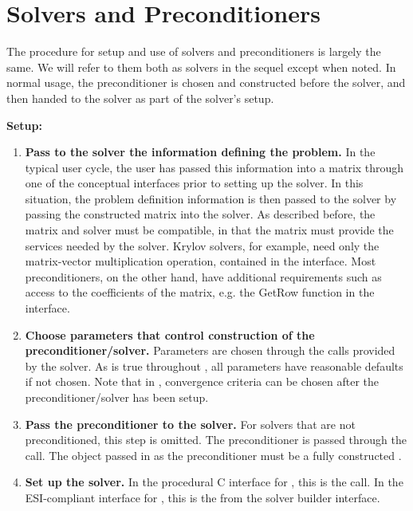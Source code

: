 \chapter{Solvers and Preconditioners}
\label{solvers}

The procedure for setup and use of solvers and preconditioners is largely
the same. We will refer to them both as solvers in the sequel except when noted. 
In normal usage, 
the preconditioner is chosen and constructed before the solver,
and then handed to the solver as part of the solver's setup.

{\bf Setup:}

\begin{enumerate}

\item
{\bf Pass to the solver the information defining the problem.} In the typical user cycle, the user
has passed this information into a matrix through one of the conceptual interfaces prior to
setting up the solver. In this situation, the problem definition information is then passed to
the solver by passing the constructed matrix into the solver. As described before, the matrix
and solver must be compatible, in that the matrix must provide the services needed by
the solver. Krylov solvers, for example, need only the matrix-vector multiplication operation,
contained in the  interface. 
Most preconditioners, on the other hand, have additional requirements such as access to the
coefficients of the matrix, e.g. the GetRow function in the  interface.

\item
{\bf Choose parameters that control construction of the preconditioner/solver.} 
Parameters are chosen through the  calls provided by the solver.
As is true throughout \hypre{}, all parameters have reasonable defaults if not chosen.
Note that in \hypre{}, convergence criteria can be chosen after the preconditioner/solver
has been setup.

\item
{\bf Pass the preconditioner to the solver.} For solvers that are not preconditioned, this step
is omitted. The preconditioner is passed through the  call. The object passed
in as the preconditioner must be a fully constructed .

\item
{\bf Set up the solver.} In the procedural C interface for \hypre{}, this is the  call.
In the ESI-compliant interface for \hypre{}, this is the  from the
solver builder interface.

\end{enumerate}

